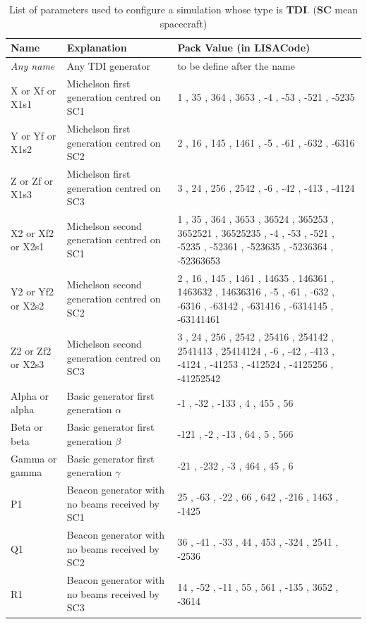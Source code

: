 \documentclass[a4paper,english,12pt]{article}
\begin{document}
\begin{table}[p]
\caption{List of parameters used to configure a simulation whose type is  \textbf{TDI}. (\textbf{SC} mean spacecraft)}
\begin{center} 
\begin{tabular}{|p{}|p{}|p{}|} 
\hline
Name & Explanation & Pack Value (in LISACode) \\ 
\hline
{\it Any name} & Any TDI generator & to be define after the name \\ 
\hline
X or Xf or X1s1 & Michelson first generation centred on SC1 & 1 , 35 , 364 , 3653 , -4 , -53 , -521 , -5235  \\ 
\hline
Y or Yf or X1s2 & Michelson first generation centred on SC2 & 2 , 16 , 145 , 1461 , -5 , -61 , -632 , -6316  \\ 
\hline
Z or Zf or X1s3 & Michelson first generation centred on SC3 & 3 , 24 , 256 , 2542 , -6 , -42 , -413 , -4124  \\ 
\hline
X2 or Xf2 or X2s1 & Michelson second generation centred on SC1 & 1 , 35 , 364 , 3653 , 36524 , 365253 , 3652521 , 36525235 ,  -4 , -53 , -521 , -5235 , -52361 , -523635 , -5236364 , -52363653  \\ 
\hline
Y2 or Yf2 or X2s2 & Michelson second generation centred on SC2 & 2 , 16 , 145 , 1461 , 14635 , 146361 , 1463632 , 14636316 , -5 , -61 , -632 , -6316 , -63142 , -631416 , -6314145 , -63141461  \\ 
\hline
Z2 or Zf2 or X2s3 & Michelson second generation centred on SC3 & 3 , 24 , 256 , 2542 , 25416 , 254142 , 2541413 , 25414124 , -6 , -42 , -413 , -4124 , -41253 , -412524 , -4125256 , -41252542  \\ 
\hline
Alpha or alpha & Basic generator first generation $\alpha$ & -1 , -32 ,  -133 , 4 , 455 , 56  \\ 
\hline
Beta or beta & Basic generator first generation $\beta$ & -121 , -2 , -13 , 64 , 5 , 566  \\ 
\hline
Gamma or gamma &Basic generator first generation $\gamma$ & -21 , -232 , -3 , 464 , 45 , 6  \\ 
\hline
P1 & Beacon generator with no beams received by SC1 & 25 , -63 , -22 , 66 , 642 , -216 , 1463 , -1425  \\ 
\hline
Q1 & Beacon generator with no beams received by SC2 & 36 , -41 , -33 , 44 , 453 , -324 , 2541 , -2536  \\ 
\hline
R1 & Beacon generator with no beams received by SC3 & 14 , -52 , -11 , 55 , 561 , -135 , 3652 , -3614  \\ 

\end{tabular}
\end{center}
\end{table}
\end{document}

